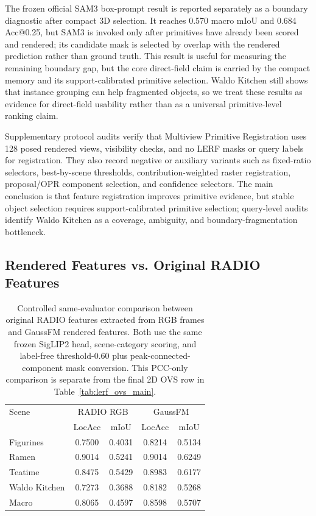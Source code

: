 \documentclass[journal,twoside]{IEEEtran}
\newcommand{\method}{GaussFM}
\begin{document}
The frozen official SAM3 box-prompt result is reported separately as a boundary
diagnostic after compact 3D selection. It reaches 0.570 macro mIoU and 0.684
Acc@0.25, but SAM3 is invoked only after primitives have already been scored and
rendered; its candidate mask is selected by overlap with the rendered prediction
rather than ground truth. This result is useful for measuring the remaining
boundary gap, but the core direct-field claim is carried by the compact memory
and its support-calibrated primitive selection.
Waldo Kitchen still shows that instance grouping can help fragmented objects,
so we treat these results as evidence for direct-field usability rather than as
a universal primitive-level ranking claim.

Supplementary protocol audits verify that Multiview Primitive Registration uses 128 posed rendered views,
visibility checks, and no LERF masks or query labels for registration. They also
record negative or auxiliary variants such as fixed-ratio selectors,
best-by-scene thresholds, contribution-weighted raster registration,
proposal/OPR component selection, and confidence selectors. The main conclusion
is that feature registration improves primitive evidence, but stable object
selection requires support-calibrated primitive selection; query-level audits identify
Waldo Kitchen as a coverage, ambiguity, and boundary-fragmentation bottleneck.

\subsection{Rendered Features vs. Original RADIO Features}

\begin{table}[t]
\centering
\caption{Controlled same-evaluator comparison between original RADIO features
extracted from RGB frames and \method{} rendered features. Both use the same
frozen SigLIP2 head, scene-category scoring, and label-free threshold-0.60 plus
peak-connected-component mask conversion. This PCC-only comparison is separate
from the final 2D OVS row in Table~\ref{tab:lerf_ovs_main}.}
\label{tab:framewise_radio_vs_rendered}
\begin{tabular}{lcccc}
\toprule
Scene & \multicolumn{2}{c}{RADIO RGB} & \multicolumn{2}{c}{\method{}} \\
 & LocAcc & mIoU & LocAcc & mIoU \\
\midrule
Figurines & 0.7500 & 0.4031 & 0.8214 & 0.5134 \\
Ramen & 0.9014 & 0.5241 & 0.9014 & 0.6249 \\
Teatime & 0.8475 & 0.5429 & 0.8983 & 0.6177 \\
Waldo Kitchen & 0.7273 & 0.3688 & 0.8182 & 0.5268 \\
\midrule
Macro & 0.8065 & 0.4597 & 0.8598 & 0.5707 \\
\bottomrule
\end{tabular}
\end{table}
\end{document}
